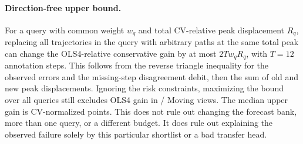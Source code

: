 \paragraph{Direction-free upper bound.}
For a query with common weight $w_q$ and total CV-relative peak
displacement $R_q$, replacing all trajectories in the query with
arbitrary paths at the same total peak can change the OLS4-relative
conservative gain by at most $2T w_q R_q$, with $T=12$ annotation
steps. This follows from the reverse triangle inequality for the
observed errors and the missing-step disagreement debit, then the
sum of old and new peak displacements. Ignoring the risk constraints,
maximizing the bound over all queries still excludes OLS4 gain in
\CrossDomainExcluded{}/\CrossDomainViews{} Moving views. The median
upper gain is \CrossDomainUpperMedian{} CV-normalized points. This
does not rule out changing the forecast bank, more than one query,
or a different budget. It does rule out explaining the observed
failure solely by this particular shortlist or a bad transfer head.
